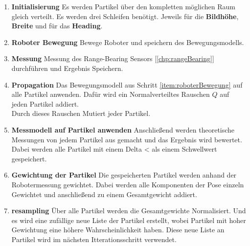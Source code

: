 \begin{enumerate}
 \item \textbf{Initialisierung}
 \label{item:init}
 Es werden Partikel über den kompletten möglichen Raum gleich verteilt. Es werden drei Schleifen benötigt. Jeweils für die \textbf{Bildhöhe}, \textbf{Breite} und für das \textbf{Heading}.\\
 
 \item \textbf{Roboter Bewegung}
 \label{item:roboterBewegung}
 Bewege Roboter und speichern des Bewegungsmodells. 
 
 \item \textbf{Messung}
 \label{item:messung}
 Messung des Range-Bearing Sensors [\ref{chp:rangeBearing}] durchführen und Ergebnis Speichern.
 
 \item \textbf{Propagation}
 \label{item:propagation}
 Das Bewegungsmodell aus Schritt \ref{item:roboterBewegung} auf alle Partikel anwenden. Dafür wird ein Normalverteiltes Rauschen $Q$ auf jeden Partikel addiert. \\
 Durch dieses Rauschen Mutiert jeder Partikel.
 
 \item \textbf{Messmodell auf Partikel anwenden}
 \label{item:messmodellAufPartikel}
 Anschließend werden theoretische Messungen von jedem Partikel aus gemacht und das Ergebnis wird bewertet. Dabei werden alle Partikel mit einem Delta < als einem Schwellwert gespeichert.
 
 \item \textbf{Gewichtung der Partikel}
 Die gespeicherten Partikel werden anhand der Robotermessung gewichtet. Dabei werden alle Komponenten der Pose einzeln Gewichtet und anschließend zu einem Gesamtgewicht addiert.
 
 \item \textbf{resampling}
 Über alle Partikel werden die Gesamtgewichte Normalisiert. Und es wird eine zufällige neue Liste der Partikel erstellt, wobei Partikel mit hoher Gewichtung eine höhere Wahrscheinlichkeit haben. Diese neue Liste an Partikel wird im nächsten Itterationsschritt verwendet.
 
 
 
 
\end{enumerate}